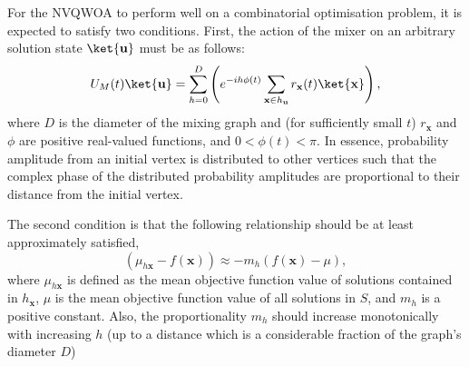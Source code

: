 For the NVQWOA to perform well on a combinatorial optimisation problem, it is expected to satisfy two conditions. First, the action of the mixer on an arbitrary solution state $\ket{\mathbf{u}}$ must be as follows:
$$
U_M(t)\ket{\mathbf{u}}=\sum_{h=0}^D \left(e^{-ih\phi(t)} \sum_{\mathbf{x}\in h_{\mathbf{u}}} r_\mathbf{x}(t)\ket{\mathbf{x}} \right),
$$
where $D$ is the diameter of the mixing graph and (for sufficiently small $t$) $r_\mathbf{x}$ and $\phi$ are positive real-valued functions, and $0<\phi(t)<\pi$. In essence, probability amplitude from an initial vertex is distributed to other vertices such that the complex phase of the distributed probability amplitudes are proportional to their distance from the initial vertex.

The second condition is that the following relationship should be at least approximately satisfied,
$$
(\mu_{h\mathbf{x}}-f(\mathbf{x}))\approx -m_h (f(\mathbf{x})-\mu),
$$
where $\mu_{h\mathbf{x}}$ is defined as the mean objective function value of solutions contained in $h_{\mathbf{x}}$, $\mu$ is the mean objective function value of all solutions in $S$, and $m_h$ is a positive constant. Also, the proportionality $m_h$ should increase monotonically with increasing $h$ (up to a distance which is a considerable fraction of the graph's diameter $D$)